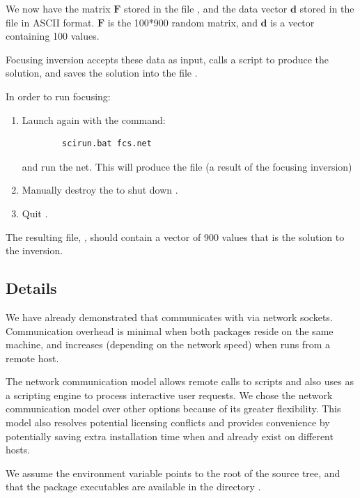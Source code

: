 We now have the matrix $\mathbf{F}$ stored in the file ,
and the data vector $\mathbf{d}$ stored in the file 
in ASCII format.  $\mathbf{F}$ is the 100*900 random matrix, and
$\mathbf{d}$ is a vector containing 100 values.

Focusing inversion accepts these data as input, calls a \m{} script
 to produce the solution, and saves the solution into the
file .

In order to run focusing:
%
\begin{enumerate}
  \item Launch \sr{} again with the command:
        \begin{verbatim}
        scirun.bat fcs.net
        \end{verbatim}
        and run the net. This will produce the file 
        (a result of the focusing inversion)
  \item Manually destroy the \mlm{} to shut down \m{}. 
  \item Quit \sr{}.
\end{enumerate}

The resulting file, , should contain a vector of
900 values that is the solution to the inversion.

\subsection{Details}

We have already demonstrated that \sr{} communicates with \m{} via network
sockets.  Communication overhead is minimal when both packages reside on
the same machine, and increases (depending on the network speed) when \m{}
runs from a remote host.

The network communication model allows remote calls to \m{} scripts and
also uses \m{} as a scripting engine to process interactive user
requests. We chose the network communication model over other options
because of its greater flexibility. This model also resolves potential
licensing conflicts and provides convenience by potentially saving extra
installation time when \sr{} and \m{} already exist on different hosts.


\ModuleRefNotes


We assume the environment variable  points to the root of
the \sr{} source tree, and that the package executables are available in
the directory .

